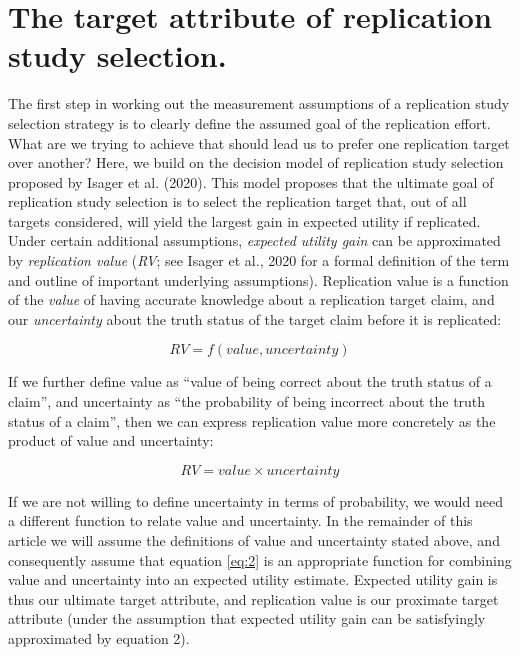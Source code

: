 \documentclass[
  english,
  jou,floatsintext]{apa6}
\begin{document}
\hypertarget{the-target-attribute-of-replication-study-selection.}{%
\section{The target attribute of replication study selection.}\label{the-target-attribute-of-replication-study-selection.}}

The first step in working out the measurement assumptions of a replication study selection strategy is to clearly define the assumed goal of the replication effort. What are we trying to achieve that should lead us to prefer one replication target over another? Here, we build on the decision model of replication study selection proposed by Isager et al. (2020). This model proposes that the ultimate goal of replication study selection is to select the replication target that, out of all targets considered, will yield the largest gain in expected utility if replicated. Under certain additional assumptions, \emph{expected utility gain} can be approximated by \emph{replication value} (\emph{RV}; see Isager et al., 2020 for a formal definition of the term and outline of important underlying assumptions). Replication value is a function of the \emph{value} of having accurate knowledge about a replication target claim, and our \emph{uncertainty} about the truth status of the target claim before it is replicated:

\begin{equation} 
  \tag{1}
  RV=f(value, uncertainty)
  \label{eq:1}
\end{equation}

If we further define value as ``value of being correct about the truth status of a claim'', and uncertainty as ``the probability of being incorrect about the truth status of a claim'', then we can express replication value more concretely as the product of value and uncertainty:

\begin{equation} 
  \tag{2}
  RV=value\times uncertainty
  \label{eq:2}
\end{equation}

If we are not willing to define uncertainty in terms of probability, we would need a different function to relate value and uncertainty. In the remainder of this article we will assume the definitions of value and uncertainty stated above, and consequently assume that equation \eqref{eq:2} is an appropriate function for combining value and uncertainty into an expected utility estimate. Expected utility gain is thus our ultimate target attribute, and replication value is our proximate target attribute (under the assumption that expected utility gain can be satisfyingly approximated by equation 2).
\end{document}

